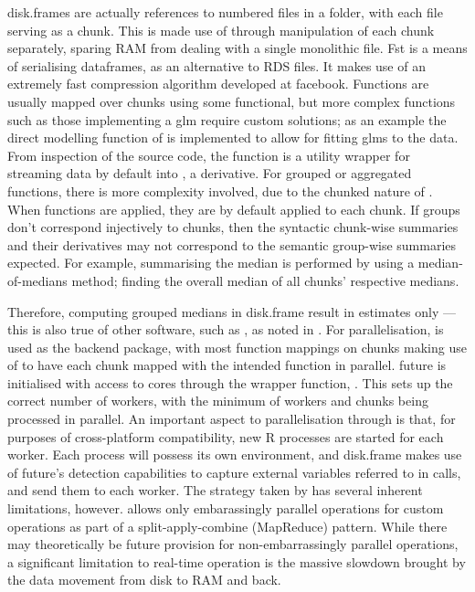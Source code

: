 disk.frames are actually references to numbered  files in a
folder, with each file serving as a chunk.
This is made use of through manipulation of each chunk separately,
sparing RAM from dealing with a single monolithic
file\cite{zj19:_inges_data}.
Fst is a means of serialising dataframes, as an alternative to RDS
files\cite{klik19}.
It makes use of an extremely fast compression algorithm developed at
facebook.
Functions are usually mapped over chunks using some functional, but more
complex functions such as those implementing a glm require custom
solutions; as an example the direct modelling function of
 is implemented to allow
for fitting glms to the data.
From inspection of the source code, the function is a utility wrapper
for streaming  data by default into , a 
derivative.
For grouped or aggregated functions, there is more complexity involved,
due to the chunked nature of .
When functions are applied, they are by default applied to each chunk.
If groups don't correspond injectively to chunks, then the syntactic
chunk-wise summaries and their derivatives may not correspond to the
semantic group-wise summaries expected.
For example, summarising the median is performed by using a
median-of-medians method; finding the overall median of all chunks'
respective medians.

Therefore, computing grouped medians in disk.frame result in estimates
only --- this is also true of other software, such as , as noted in
\cite{zj19:_group_by}.
For parallelisation,  is used as the backend package, with most
function mappings on chunks making use of
to have each chunk mapped with the intended function in parallel.
future is initialised with access to cores through the wrapper function,
\cite{zj19:_key}.
This sets up the correct number of workers, with the minimum of workers
and chunks being processed in parallel.
An important aspect to parallelisation through  is that, for
purposes of cross-platform compatibility, new R processes are started
for each worker\cite{zj19:_using}.
Each process will possess its own environment, and disk.frame makes use
of future's detection capabilities to capture external variables
referred to in calls, and send them to each worker.
The strategy taken by  has several inherent
limitations, however.  allows only embarassingly
parallel operations for custom operations as part of a
split-apply-combine (MapReduce) pattern.
While there may theoretically be future provision for non-embarrassingly
parallel operations, a significant limitation to real-time operation is
the massive slowdown brought by the data movement from disk to RAM and
back.

